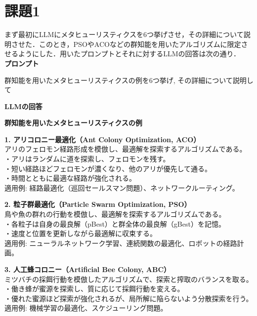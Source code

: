 \documentclass[a4paper]{ltjsarticle}
\begin{document}
\section{課題1}
まず最初にLLMにメタヒューリスティクスを6つ挙げさせ，その詳細について説明させた．このとき，PSOやACOなどの群知能を用いたアルゴリズムに限定させるようにした．用いたプロンプトとそれに対するLLMの回答は次の通り．\\
\textbf{プロンプト}
\begin{tcolorbox}[arc=4mm, enhanced, borderline={0.5mm}{0mm}{black}, breakable, colback = white]
群知能を用いたメタヒューリスティクスの例を6つ挙げ, その詳細について説明して
\end{tcolorbox}
\noindent\textbf{LLMの回答}
\begin{tcolorbox}[arc=6mm, enhanced, borderline={0.5mm}{0mm}{black}, breakable, colback = white]
    \textbf{ 群知能を用いたメタヒューリスティクスの例}

    \vspace{10pt}
    
    \noindent \textbf{1. アリコロニー最適化（Ant Colony Optimization, ACO）}\\
    アリのフェロモン経路形成を模倣し、最適解を探索するアルゴリズムである。\\
    ・アリはランダムに道を探索し、フェロモンを残す。\\
    ・短い経路ほどフェロモンが濃くなり、他のアリが優先して通る。\\
    ・時間とともに最適な経路が強化される。\\
    適用例: 経路最適化（巡回セールスマン問題）、ネットワークルーティング。
    
    \vspace{10pt}
    
    \noindent \textbf{2. 粒子群最適化（Particle Swarm Optimization, PSO）}\\
    鳥や魚の群れの行動を模倣し、最適解を探索するアルゴリズムである。\\
    ・各粒子は自身の最良解（pBest）と群全体の最良解（gBest）を記憶。\\
    ・速度と位置を更新しながら最適解に収束する。\\
    適用例: ニューラルネットワーク学習、連続関数の最適化、ロボットの経路計画。
    
    \vspace{10pt}
    
    \noindent \textbf{3. 人工蜂コロニー（Artificial Bee Colony, ABC）}\\
    ミツバチの採餌行動を模倣したアルゴリズムで、探索と搾取のバランスを取る。\\
    ・働き蜂が蜜源を探索し、質に応じて採餌行動を変える。\\
    ・優れた蜜源ほど探索が強化されるが、局所解に陥らないよう分散探索を行う。\\
    適用例: 機械学習の最適化、スケジューリング問題。
    

\end{tcolorbox}
\end{document}
